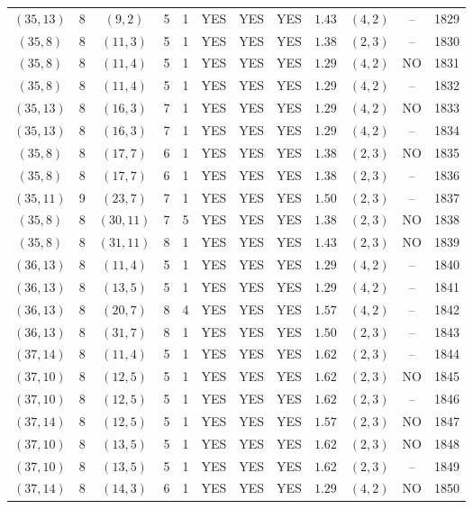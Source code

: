\begin{longtable}{|c|c|c|c|c|c|c|c|c|c|c|c|}
$(35,13)$ & 8 & $(9,2)$ & 5 & 1 & YES & YES & YES & $1.43$ & $(4,2)$ & -- & 1829\\
$(35,8)$ & 8 & $(11,3)$ & 5 & 1 & YES & YES & YES & $1.38$ & $(2,3)$ & -- & 1830\\
$(35,8)$ & 8 & $(11,4)$ & 5 & 1 & YES & YES & YES & $1.29$ & $(4,2)$ & NO & 1831\\
$(35,8)$ & 8 & $(11,4)$ & 5 & 1 & YES & YES & YES & $1.29$ & $(4,2)$ & -- & 1832\\
$(35,13)$ & 8 & $(16,3)$ & 7 & 1 & YES & YES & YES & $1.29$ & $(4,2)$ & NO & 1833\\
$(35,13)$ & 8 & $(16,3)$ & 7 & 1 & YES & YES & YES & $1.29$ & $(4,2)$ & -- & 1834\\
$(35,8)$ & 8 & $(17,7)$ & 6 & 1 & YES & YES & YES & $1.38$ & $(2,3)$ & NO & 1835\\
$(35,8)$ & 8 & $(17,7)$ & 6 & 1 & YES & YES & YES & $1.38$ & $(2,3)$ & -- & 1836\\
$(35,11)$ & 9 & $(23,7)$ & 7 & 1 & YES & YES & YES & $1.50$ & $(2,3)$ & -- & 1837\\
$(35,8)$ & 8 & $(30,11)$ & 7 & 5 & YES & YES & YES & $1.38$ & $(2,3)$ & NO & 1838\\
$(35,8)$ & 8 & $(31,11)$ & 8 & 1 & YES & YES & YES & $1.43$ & $(2,3)$ & NO & 1839\\
$(36,13)$ & 8 & $(11,4)$ & 5 & 1 & YES & YES & YES & $1.29$ & $(4,2)$ & -- & 1840\\
$(36,13)$ & 8 & $(13,5)$ & 5 & 1 & YES & YES & YES & $1.29$ & $(4,2)$ & -- & 1841\\
$(36,13)$ & 8 & $(20,7)$ & 8 & 4 & YES & YES & YES & $1.57$ & $(4,2)$ & -- & 1842\\
$(36,13)$ & 8 & $(31,7)$ & 8 & 1 & YES & YES & YES & $1.50$ & $(2,3)$ & -- & 1843\\
$(37,14)$ & 8 & $(11,4)$ & 5 & 1 & YES & YES & YES & $1.62$ & $(2,3)$ & -- & 1844\\
$(37,10)$ & 8 & $(12,5)$ & 5 & 1 & YES & YES & YES & $1.62$ & $(2,3)$ & NO & 1845\\
$(37,10)$ & 8 & $(12,5)$ & 5 & 1 & YES & YES & YES & $1.62$ & $(2,3)$ & -- & 1846\\
$(37,14)$ & 8 & $(12,5)$ & 5 & 1 & YES & YES & YES & $1.57$ & $(2,3)$ & NO & 1847\\
$(37,10)$ & 8 & $(13,5)$ & 5 & 1 & YES & YES & YES & $1.62$ & $(2,3)$ & NO & 1848\\
$(37,10)$ & 8 & $(13,5)$ & 5 & 1 & YES & YES & YES & $1.62$ & $(2,3)$ & -- & 1849\\
$(37,14)$ & 8 & $(14,3)$ & 6 & 1 & YES & YES & YES & $1.29$ & $(4,2)$ & NO & 1850\\

\end{longtable}
